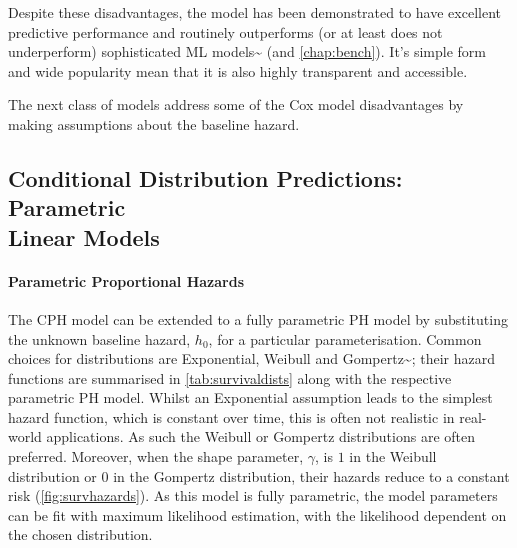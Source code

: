 \documentclass[
  letterpaper,
]{scrbook}
\let\oldparagraph\paragraph
\renewcommand{\paragraph}[1]{\oldparagraph{#1}\mbox{}}
\theoremstyle{plain}
\theoremstyle{definition}
\theoremstyle{remark}
\begin{document}
Despite these disadvantages, the model has been demonstrated to have
excellent predictive performance and routinely outperforms (or at least
does not underperform) sophisticated ML
models\textasciitilde{}\cite{Gensheimer2018, Luxhoj1997, VanBelle2011b}
(and \ref{chap:bench}). It's simple form and wide popularity mean that
it is also highly transparent and accessible.

The next class of models address some of the Cox model disadvantages by
making assumptions about the baseline hazard.

\subsection[Conditional Distribution Predictions: Parametric Linear Models]{Conditional Distribution Predictions: Parametric\\Linear Models}
\label{sec:surv_models_param}

\paragraph{Parametric Proportional Hazards}

The CPH model can be extended to a fully parametric PH model by
substituting the unknown baseline hazard, \(h_0\), for a particular
parameterisation. Common choices for distributions are Exponential,
Weibull and Gompertz\textasciitilde{}\cite{Kalbfleisch2011, Wang2017};
their hazard functions are summarised in \ref{tab:survivaldists} along
with the respective parametric PH model. Whilst an Exponential
assumption leads to the simplest hazard function, which is constant over
time, this is often not realistic in real-world applications. As such
the Weibull or Gompertz distributions are often preferred. Moreover,
when the shape parameter, \(\gamma\), is \(1\) in the Weibull
distribution or \(0\) in the Gompertz distribution, their hazards reduce
to a constant risk (\ref{fig:survhazards}). As this model is fully
parametric, the model parameters can be fit with maximum likelihood
estimation, with the likelihood dependent on the chosen distribution.
\end{document}
